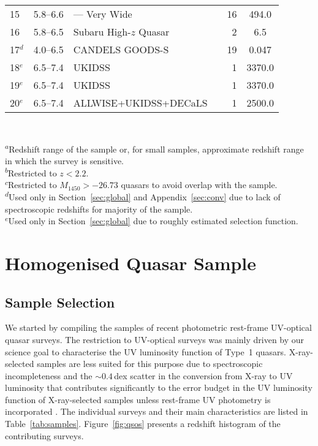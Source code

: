 \documentclass[fleqn,usenatbib]{mnras}
\begin{document}
\begin{table*}
\begin{tabular}{lcllrS}
    15 & 5.8--6.6 & --- Very Wide & \citet{2010AJ....139..906W} & 16 & 494.0 \\
    16 & 5.8--6.5 & Subaru High-$z$ Quasar & \citet{2015ApJ...798...28K} & 2 & 6.5 \\
    17$^d$ &4.0--6.5 & CANDELS GOODS-S & \citet{2015AA...578A..83G} & 19 & 0.047 \\
    18$^e$ & 6.5--7.4 & UKIDSS & \citet{2011Natur.474..616M} & 1 & 3370.0 \\
    19$^e$ & 6.5--7.4 & UKIDSS & \citet{2015ApJ...801L..11V} & 1 & 3370.0 \\
    20$^e$ & 6.5--7.4 & ALLWISE+UKIDSS+DECaLS & \citet{2018Natur.553..473B} & 1 & 2500.0 \\
    \hline
  \end{tabular}\\
  \begin{minipage}{14.5cm}
    \textsuperscript{$a$}{Redshift range of the sample or, for small
      samples, approximate redshift range in which the survey is
      sensitive.}\\
    \textsuperscript{$b$}{Restricted to $z<2.2$.}\\
    \textsuperscript{$c$}{Restricted to $M_{1450}>-26.73$ quasars to
      avoid overlap with the \citet{2016ApJ...829...33Y} sample.}\\
    \textsuperscript{$d$}{Used only in Section~\ref{sec:global} and
      Appendix~\ref{sec:conv} due to lack of spectroscopic redshifts
      for majority of the sample.}\\
    \textsuperscript{$e$}{Used only in Section~\ref{sec:global} due to
      roughly estimated selection function.}
 \end{minipage}
\end{table*}

\section{Homogenised Quasar Sample}
\label{sec:sample}

\subsection{Sample Selection}
\label{sect:samplesel}

We started by compiling the samples of recent photometric rest-frame
UV-optical quasar surveys. The restriction to UV-optical surveys was
mainly driven by our science goal to characterise the UV luminosity
function of Type~1 quasars. X-ray-selected samples are less suited for
this purpose due to spectroscopic incompleteness and the $\sim
0.4$\,dex scatter in the conversion from X-ray to UV luminosity
\citep{2010A&A...512A..34L, 2015MNRAS.453.1946G, 2016ApJ...819..154L}
that contributes significantly to the error budget in the UV
luminosity function of X-ray-selected samples unless rest-frame UV
photometry is incorporated \citep{2015AA...578A..83G}.  The individual
surveys and their main characteristics are listed in
Table~\ref{tab:samples}.  Figure~\ref{fig:qsos} presents a redshift
histogram of the contributing surveys.
\end{document}
